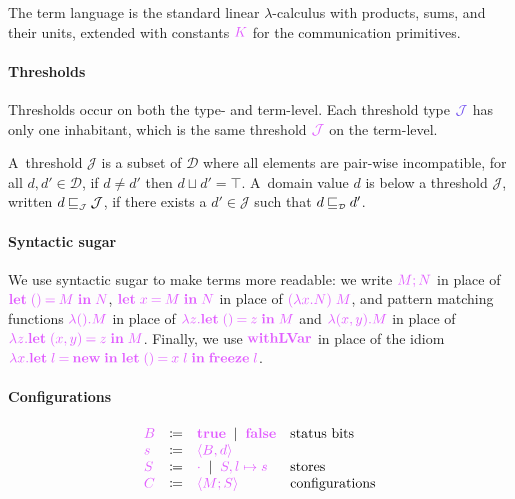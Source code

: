 \documentclass[main.tex]{subfiles}
\begin{document}
The term language is the standard linear $\lambda$-calculus with products, sums, and their units, extended with constants $\tm{K}$ for the communication primitives. 

\paragraph*{Thresholds}
Thresholds occur on both the type- and term-level. Each threshold type $\tyJ$ has only one inhabitant, which is the same threshold $\tmJ$ on the term-level.

A~threshold $\mathcal{J}$ is a subset of $\mathcal{D}$ where all elements are pair-wise incompatible, \ie for all $d,d'\in\mathcal{D}$, if ${d}\neq{d'}$ then ${d}\sqcup{d'}={\top}$.
A~domain value $d$ is below a threshold $\mathcal{J}$, written ${d}\mathbin{{\color{black}\sqsubseteq_{\scriptscriptstyle\mathcal{J}}}}\mathcal{J}$, if there exists a ${d'}\in\mathcal{J}$ such that ${d}\mathbin{{\color{black}\sqsubseteq_{\scriptscriptstyle\mathcal{D}}}}{d'}$.

\paragraph*{Syntactic sugar}
We use syntactic sugar to make terms more readable: we write $\tm{\andthen{M}{N}}$ in place of $\tm{\letunit{M}{N}}$, $\tm{\letbind{x}{M}{N}}$ in place of $\tm{(\lambda x.N)\;M}$, and pattern matching functions $\tm{\lambda\unit.M}$ in place of $\tm{\lambda z.\letunit{z}{M}}$ and $\tm{\lambda\pair{x}{y}.M}$ in place of $\tm{\lambda z.\letpair{x}{y}{z}{M}}$. Finally, we use $\tm{\lvarrun}$ in place of the idiom $\tm{\lambda x.\letbind{l}{\lvarnew}{\letunit{x\;l}{\lvarfreeze\;l}}}$.

\paragraph*{Configurations}
\[
\begin{array}{lrll}
  \tm{B}
  & \coloneqq & \tm{\true}
    \sep        \tm{\false} & \text{status bits}
  \\
  \tm{s}
  & \coloneqq & \tm{\langle B, d \rangle}
  \\
  \tm{S}
  & \coloneqq & \tm{\emptyenv}
    \sep        \tm{S, l \mapsto s} & \text{stores}
  \\
  \tm{C}
  & \coloneqq & \tm{\config{M}{S}} & \text{configurations}
\end{array}
\]
\end{document}
